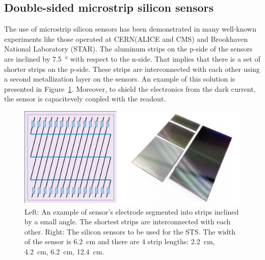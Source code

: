 




\subsection{Double-sided microstrip silicon sensors}
\label{sensors}

The use of microstrip silicon sensors has been demonstrated in many well-known experiments like those operated at \gls{CERN}(\gls{ALICE} and \gls{CMS}) and Brookhaven National Laboratory (\gls{STAR}). The aluminum strips on the p-side of the sensors are inclined by \SI{7.5}{\degree} with respect to the n-side. That implies that there is a set of shorter strips on the p-side. These strips are interconnected with each other using a second metallization layer on the sensors. An example of this solution is presented in Figure~\ref{fig_sts_si}. Moreover, to shield the electronics from the dark current, the sensor is capacitevely coupled with the readout.

\begin{figure}[!h]
\centering
\includegraphics[width=0.75\columnwidth]{Chapter2/images/silicon_sensors.png}
\caption{Left: An example of sensor's electrode segmented into strips inclined by a small angle. The shortest strips are interconnected with each other. Right: The silicon sensors to be used for the \gls{STS}. The width of the sensor is \SI{6.2}{\centi\metre} and there are 4 strip lengths: \SI{2.2}{\centi\metre}, \SI{4.2}{\centi\metre}, \SI{6.2}{\centi\metre}, \SI{12.4}{\centi\metre}.}
\label{fig_sts_si}
\end{figure}

